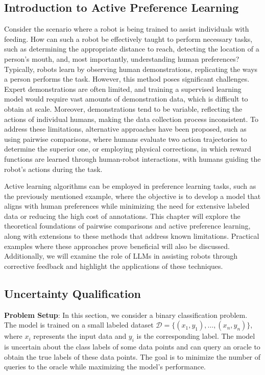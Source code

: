 \documentclass[
  letterpaper,
  numbers=noenddot,
  DIV=11]{scrreprt}
\theoremstyle{plain}
\theoremstyle{definition}
\theoremstyle{plain}
\theoremstyle{remark}
\begin{document}
\subsection{Introduction to Active Preference
Learning}\label{introduction-to-active-preference-learning}

Consider the scenario where a robot is being trained to assist
individuals with feeding. How can such a robot be effectively taught to
perform necessary tasks, such as determining the appropriate distance to
reach, detecting the location of a person's mouth, and, most
importantly, understanding human preferences? Typically, robots learn by
observing human demonstrations, replicating the ways a person performs
the task. However, this method poses significant challenges. Expert
demonstrations are often limited, and training a supervised learning
model would require vast amounts of demonstration data, which is
difficult to obtain at scale. Moreover, demonstrations tend to be
variable, reflecting the actions of individual humans, making the data
collection process inconsistent. To address these limitations,
alternative approaches have been proposed, such as using pairwise
comparisons, where humans evaluate two action trajectories to determine
the superior one, or employing physical corrections, in which reward
functions are learned through human-robot interactions, with humans
guiding the robot's actions during the task.

Active learning algorithms can be employed in preference learning tasks,
such as the previously mentioned example, where the objective is to
develop a model that aligns with human preferences while minimizing the
need for extensive labeled data or reducing the high cost of
annotations. This chapter will explore the theoretical foundations of
pairwise comparisons and active preference learning, along with
extensions to these methods that address known limitations. Practical
examples where these approaches prove beneficial will also be discussed.
Additionally, we will examine the role of LLMs in assisting robots
through corrective feedback and highlight the applications of these
techniques.

\subsection{Uncertainty Qualification}\label{uncertainty-qualification}

\textbf{Problem Setup}: In this section, we consider a binary
classification problem. The model is trained on a small labeled dataset
\(\mathcal{D} = \{(x_1, y_1), \ldots, (x_n, y_n)\}\), where \(x_i\)
represents the input data and \(y_i\) is the corresponding label. The
model is uncertain about the class labels of some data points and can
query an oracle to obtain the true labels of these data points. The goal
is to minimize the number of queries to the oracle while maximizing the
model's performance.
\end{document}
